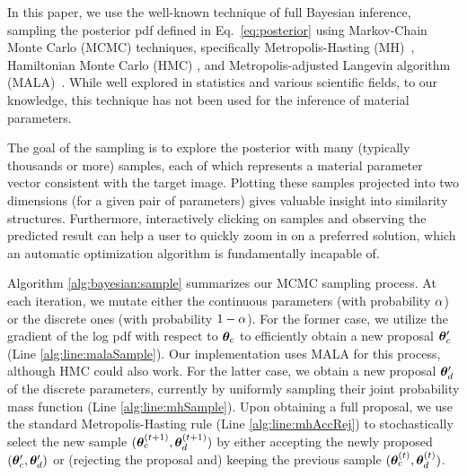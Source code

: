 In this paper, we use the well-known technique of full Bayesian inference, sampling the posterior pdf defined in Eq.~\eqref{eq:posterior} using Markov-Chain Monte Carlo (MCMC) techniques, specifically Metropolis-Hasting (MH)~\cite{hastings1970monte}, Hamiltonian Monte Carlo (HMC) \cite{betancourt2017conceptual}, and Metropolis-adjusted Langevin algorithm (MALA)~\cite{roberts1996exponential}. While well explored in statistics and various scientific fields, to our knowledge, this technique has not been used for the inference of material parameters.

The goal of the sampling is to explore the posterior with many (typically thousands or more) samples, each of which represents a material parameter vector consistent with the target image. Plotting these samples projected into two dimensions (for a given pair of parameters) gives valuable insight into similarity structures. Furthermore, interactively clicking on samples and observing the predicted result can help a user to quickly zoom in on a preferred solution, which an automatic optimization algorithm is fundamentally incapable of.



Algorithm \ref{alg:bayesian:sample} summarizes our MCMC sampling process. At each iteration, we mutate either the continuous parameters (with probability $\alpha$) or the discrete ones (with probability $1 - \alpha$).
For the former case, we utilize the gradient of the log pdf with respect to $\bm{\theta}_c$ to efficiently obtain a new proposal $\bm{\theta}_c'$ (Line \ref{alg:line:malaSample}).
Our implementation uses MALA for this process, although HMC could also work.
For the latter case, we obtain a new proposal $\bm{\theta}_d'$ of the discrete parameters, currently by uniformly sampling their joint probability mass function (Line \ref{alg:line:mhSample}).
Upon obtaining a full proposal, we use the standard Metropolis-Hasting rule (Line \ref{alg:line:mhAccRej}) to stochastically select the new sample $(\bm{\theta}_c^{(t + 1)}, \bm{\theta}_d^{(t + 1)})$ by either accepting the newly proposed $(\bm{\theta}_c', \bm{\theta}_d')$ or (rejecting the proposal and) keeping the previous sample $(\bm{\theta}_c^{(t)}, \bm{\theta}_d^{(t)})$.
